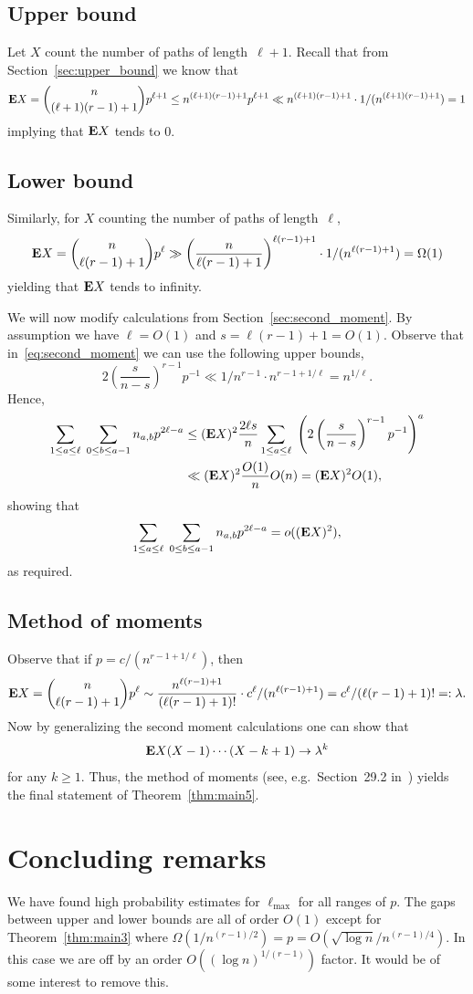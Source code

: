 \documentclass[12pt,reqno]{amsart}
\theoremstyle{remark}
\def\E{\mbox{{\bf E}}}
\def\E{\mbox{{\bf E}}}
\begin{document}
\subsection{Upper bound}\label{sec:8}

Let $X$ count the number of paths of length~$\ell+1$.
Recall that from Section~\ref{sec:upper_bound} we know that
\[
\E X = \binom{n}{(\ell+1)(r-1)+1}p^{\ell+1}
\le n^{(\ell+1)(r-1)+1} p^{\ell+1}
\ll n^{(\ell+1)(r-1)+1} \cdot 1/(n^{(\ell+1)(r-1)+1}) = 1
\]
implying that $\E X$ tends to 0.

\subsection{Lower bound}

Similarly, for $X$ counting the number of paths of length~$\ell$,
\[
\E X = \binom{n}{\ell(r-1)+1}p^\ell
\gg \left(\frac{n}{\ell(r-1)+1}\right)^{\ell(r-1)+1} \cdot 1/(n^{\ell(r-1)+1}) = \Omega(1)
\]
yielding that $\E X$ tends to infinity.

We will now modify calculations from Section~\ref{sec:second_moment}. By assumption we have $\ell=O(1)$ and $s=\ell(r-1)+1=O(1)$. Observe that in~\eqref{eq:second_moment} we can use the following upper bounds,
\[
2\left(\frac{s}{n-s}\right)^{r-1} p^{-1} \ll 1/n^{r-1} \cdot n^{r-1+1/\ell} = n^{1/\ell}.
\]
Hence,
\begin{align*}
\sum_{1\le a \le \ell}\; \sum_{0\le b \le a-1} n_{a,b} p^{2\ell-a}
&\le (\E X)^2 \frac{2\ell s}{n} \sum_{1\le a \le \ell}\; \left(2 \left(\frac{s}{n-s}\right)^{r-1} p^{-1} \right)^a\\
&\ll (\E X)^2 \frac{O(1)}{n} O(n) = (\E X)^2 O(1),
\end{align*}
showing that 
\[
\sum_{1\le a \le \ell}\; \sum_{0\le b \le a-1} n_{a,b} p^{2\ell-a} =o((\E X)^2),
\]
as required.

\subsection{Method of moments}
Observe that if $p=c/(n^{r-1+1/\ell})$, then
\[
\E X = \binom{n}{\ell(r-1)+1}p^\ell
\sim \frac{n^{\ell(r-1)+1} }{(\ell(r-1)+1)!}\cdot c^\ell/(n^{\ell(r-1)+1}) = c^\ell/(\ell(r-1)+1)! =:\lambda.
\]
Now by generalizing the second moment calculations one can show that 
\[
\E X(X-1)\cdots (X-k+1)\to \lambda^k
\] 
for any $k\ge1$. Thus, the method of moments (see, e.g.\ Section~29.2 in~\cite{FK}) yields the final statement of Theorem~\ref{thm:main5}. 
\section{Concluding remarks}
We have found high probability estimates for $\ell_{\max}$ for all ranges of $p$. The gaps between upper and lower bounds are all of order $O(1)$ except for Theorem~\ref{thm:main3} where $\Omega(1/n^{(r-1)/2}) = p = O(\sqrt{\log n}/n^{(r-1)/4})$. In this case we are off by an order $O((\log n)^{1/(r-1)})$ factor. It would be of some interest to remove this.
\end{document}
